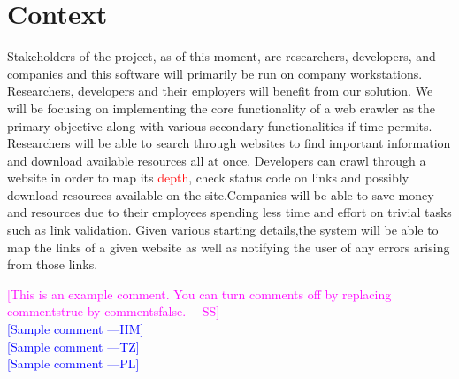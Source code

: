 \documentclass[12pt]{article}
\newcommand{\authornote}[3]{\textcolor{#1}{[#3 ---#2]}}
\newcommand{\authornote}[3]{}
\newcommand{\wss}[1]{\authornote{magenta}{SS}{#1}}
\newcommand{\hm}[1]{\authornote{blue}{HM}{#1}} %
\newcommand{\tz}[1]{\authornote{blue}{TZ}{#1}} %
\newcommand{\pl}[1]{\authornote{blue}{PL}{#1}} %
\begin{document}
\section{Context}

Stakeholders of the project, as of this moment, are researchers, developers, and companies and this software will primarily be run on company workstations.\\

Researchers, developers and their employers will benefit from our solution. We will be focusing on implementing the core functionality of a web crawler as the primary objective along with various secondary functionalities if time permits. Researchers will be able to search through websites to find important information and download available resources all at once. Developers can crawl through a website in order to map its \textcolor{red}{depth}, check status code on links and possibly download resources available on the site.Companies will be able to save money and resources due to their employees spending less time and effort on trivial tasks such as link validation. Given various starting details,the system will be able to map the links of a given website as well as notifying the user of any errors arising from those links.\newline



\noindent \wss{This is an example comment.  You can turn comments off by replacing
  commentstrue by commentsfalse.}\\
\hm{Sample comment}\\
\tz{Sample comment}\\
\pl{Sample comment}
\end{document}
